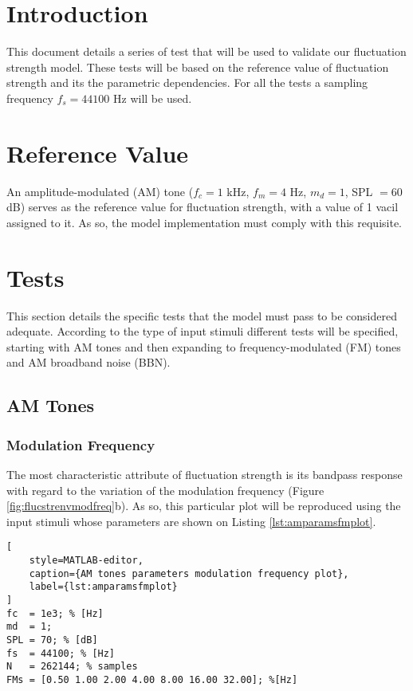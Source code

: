 \documentclass[a4paper]{article}
\begin{document}

\section{Introduction}

This document details a series of test that will be used to validate our
fluctuation strength model. These tests will be based on the reference value of
fluctuation strength and its the parametric dependencies. For all the tests a
sampling frequency $f_s = 44100 $ Hz will be used.

\section{Reference Value}

An amplitude-modulated (AM) tone ($f_c = 1$ kHz, $f_m = 4$ Hz, $m_d = 1$,
SPL $=60$ dB) serves as the reference value for fluctuation strength, with a
value of 1 vacil assigned to it. As so, the model implementation must comply
with this requisite.

\section{Tests}

This section details the specific tests that the model must pass to be
considered adequate. According to the type of input stimuli different tests
will be specified, starting with AM tones and then expanding to
frequency-modulated (FM) tones and AM broadband noise (BBN).

\subsection{AM Tones}

\subsubsection{Modulation Frequency}

The most characteristic attribute of fluctuation strength is its bandpass
response with regard to the variation of the modulation frequency (Figure
\ref{fig:flucstrenvmodfreq}b). As so, this particular plot will be reproduced
using the input stimuli whose parameters are shown on Listing
\ref{lst:amparamsfmplot}.

\begin{lstlisting}[
    style=MATLAB-editor,
    caption={AM tones parameters modulation frequency plot},
    label={lst:amparamsfmplot}
]
fc  = 1e3; % [Hz]
md  = 1;
SPL = 70; % [dB]
fs  = 44100; % [Hz]
N   = 262144; % samples
FMs = [0.50 1.00 2.00 4.00 8.00 16.00 32.00]; %[Hz]
\end{lstlisting}
\end{document}

